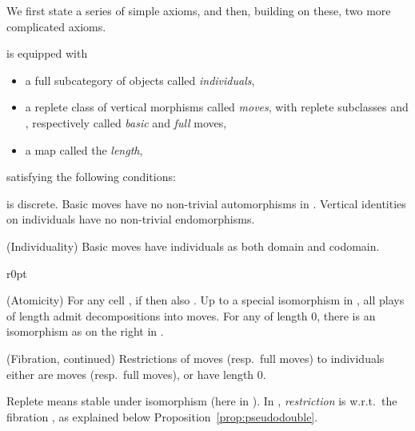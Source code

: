\documentclass{LMCS}
\theoremstyle{plain}\newtheorem{satz}[thm]{Satz}
\begin{document}
We first state a series of simple axioms, and then, building on these,
two more complicated axioms.
\begin{ax}\label{ax:indivmoves}
   is equipped with
  \begin{itemize}
  \item a full subcategory  of objects called
    \emph{individuals},
  \item a replete class  of vertical morphisms called \emph{moves},
    with replete subclasses  and , respectively called
    \emph{basic} and \emph{full} moves,
  \item a map  called the \emph{length},
  \end{itemize}
  satisfying the following conditions:
  \begin{axioms}
  \item  is discrete. Basic moves have no non-trivial
    automorphisms in .  Vertical identities on individuals have
    no non-trivial endomorphisms.
    \label{discreteness}
  \item (Individuality) Basic moves have individuals as both domain
    and codomain. \label{individuality}
  \item
    \begin{minipage}[t]{.97\linewidth}
      \vspace*{-.82em}
      \begin{wrapfigure}{r}{0pt}
        \begin{minipage}[t]{.18\linewidth}
          \vspace*{-1.5em} 
        \end{minipage}
      \end{wrapfigure}
      (Atomicity) For any cell , if  then also .  Up to a special isomorphism in
      , all plays  of length  admit decompositions into
       moves.  For any  of length 0, there is
      an isomorphism  as on the right in .
    \end{minipage}
\label{atomicity}
\item (Fibration, continued) Restrictions of moves (resp.\ full moves)
  to individuals either are moves (resp.\ full moves), or have length
  0. \label{fibration:continued}
  \end{axioms}
\end{ax}
Replete means stable under isomorphism (here in ).  In
, \emph{restriction} is w.r.t.\ the
fibration , as explained below
Proposition~\ref{prop:pseudodouble}. 
\end{document}
